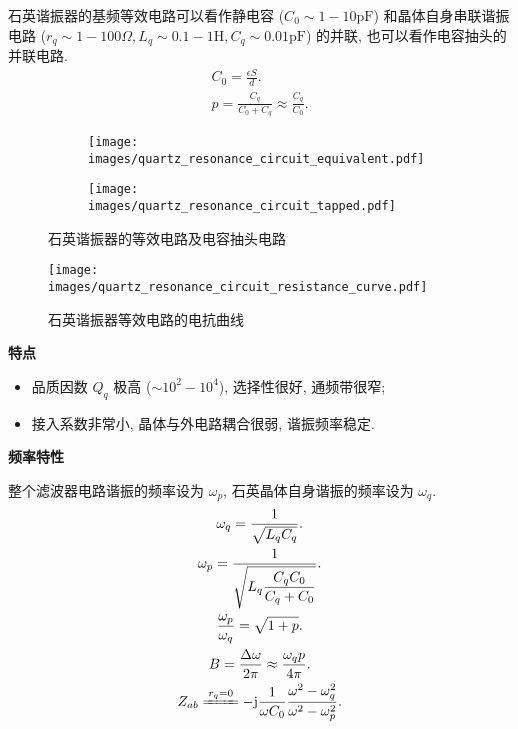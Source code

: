 石英谐振器的基频等效电路可以看作静电容 ($C_0\sim 1-10\mathrm{pF}$) 和晶体自身串联谐振电路 ($r_q\sim 1-100\Omega,L_q\sim 0.1-1\mathrm{H},C_q\sim 0.01\mathrm{pF}$) 的并联, 也可以看作电容抽头的并联电路.
\begin{gather}
    C_0=\frac{\epsilon S}{d}. \\
    p=\frac{C_q}{C_0+C_q}\approx\frac{C_q}{C_0}.
\end{gather}

\begin{figure}[ht]
    \centering
    \begin{minipage}{.51\textwidth}
        \centering
        \begin{subfigure}{.47\textwidth}
            \centering
            \texttt{[image: images/quartz\_resonance\_circuit\_equivalent.pdf]}
            \caption{}
        \end{subfigure}
        \begin{subfigure}{.47\textwidth}
            \centering
            \texttt{[image: images/quartz\_resonance\_circuit\_tapped.pdf]}
            \caption{}
        \end{subfigure}
        \caption{石英谐振器的等效电路及电容抽头电路}
    \end{minipage}
    \begin{minipage}{.47\textwidth}
        \centering
        \texttt{[image: images/quartz\_resonance\_circuit\_resistance\_curve.pdf]}
        \caption{石英谐振器等效电路的电抗曲线}
    \end{minipage}
\end{figure}

\textbf{特点}
\begin{itemize}
    \item 品质因数 $Q_q$ 极高 ($\sim 10^2-10^4$), 选择性很好, 通频带很窄;
    \item 接入系数非常小, 晶体与外电路耦合很弱, 谐振频率稳定.
\end{itemize}

\textbf{频率特性}

整个滤波器电路谐振的频率设为 $\omega_p$, 石英晶体自身谐振的频率设为 $\omega_q$.
\begin{gather}
    \omega_q=\frac{1}{\sqrt{L_qC_q}}. \\
    \omega_p=\frac{1}{\sqrt{L_q\dfrac{C_qC_0}{C_q+C_0}}}. \\
    \frac{\omega_p}{\omega_q}=\sqrt{1+p}. \label{eq:2.5 quartz omega_p omega_q} \\
    B=\frac{\Delta\omega}{2\pi}\approx\frac{\omega_qp}{4\pi}. \label{eq:2.5 quartz B} \\
    Z_{ab}\xlongequal{r_q=0}-\mathrm{j}\frac{1}{\omega C_0}\frac{\omega^2-\omega_q^2}{\omega^2-\omega_p^2}.
\end{gather}

